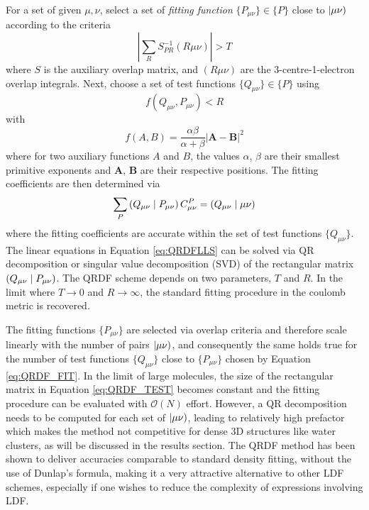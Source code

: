 For a set of given $\mu,\nu$, select a set of \emph{fitting function} $\{P_{\mu\nu}\} \in \{P\}$ close to $\left\lvert \mu\nu \right)$ according to the criteria
\begin{equation}
\left\lvert \sum_R S_{PR}^{-1} (R\mu\nu) \right\rvert > T 
\label{eq:QRDF_FIT}
\end{equation} 
\noindent where $S$ is the auxiliary overlap matrix, and $(R\mu\nu)$ are the 3-centre-1-electron overlap integrals. Next, choose a set of test functions $\{Q_{\mu\nu}\} \in \{P\}$ using
\begin{equation}
f(Q_{\mu\nu},P_{\mu\nu}) < R
\label{eq:QRDF_TEST}
\end{equation}
\noindent with
\begin{equation}
f(A,B) = \frac{\alpha \beta}{\alpha + \beta} \left\lvert \mathbf{A} - \mathbf{B} \right\rvert^2
\end{equation}
\noindent where for two auxiliary functions $A$ and $B$, the values $\alpha$, $\beta$ are their smallest primitive exponents and $\mathbf{A}$, $\mathbf{B}$ are their respective positions. The fitting coefficients are then determined via
\begin{equation}
\sum_P \left( Q_{\mu\nu} \mid P_{\mu\nu} \right) C^P_{\mu\nu} = \left( Q_{\mu\nu} \mid \mu\nu \right)
\label{eq:QRDFLLS}
\end{equation}
\noindent where the fitting coefficients are accurate within the set of test functions $\{Q_{\mu\nu}\}$. The linear equations in Equation \ref{eq:QRDFLLS} can be solved via QR decomposition or singular value decomposition (SVD) of the rectangular matrix $\left( Q_{\mu\nu} \mid P_{\mu\nu} \right)$.
The QRDF scheme depends on two parameters, $T$ and $R$. In the limit where $T \rightarrow 0$ and $R \rightarrow \infty$, the standard fitting procedure in the coulomb metric is recovered. 

The fitting functions $\{P_{\mu\nu}\}$ are selected via overlap criteria and therefore scale linearly with the number of pairs $\left\lvert \mu\nu \right)$, and consequently the same holds true for the number of test functions $\{Q_{\mu\nu}\}$ close to $\{P_{\mu\nu}\}$ chosen by Equation \ref{eq:QRDF_FIT}. In the limit of large molecules, the size of the rectangular matrix in Equation \ref{eq:QRDF_TEST} becomes constant and the fitting procedure can be evaluated with $\mathcal{O}(N)$ effort. However, a QR decomposition needs to be computed for each set of $\left\lvert \mu\nu \right)$, leading to relatively high prefactor which makes the method not competitive for dense 3D structures like water clusters, as will be discussed in the results section.
The QRDF method has been shown to deliver accuracies comparable to standard density fitting, without the use of Dunlap's formula, making it a very attractive alternative to other LDF schemes, especially if one wishes to reduce the complexity of expressions involving LDF.

